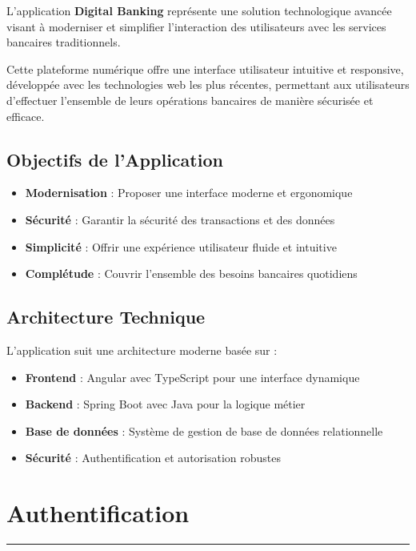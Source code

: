 \documentclass[11pt, a4paper]{article}
\newcommand{\accentline}{\textcolor{accent}{\rule{\textwidth}{1pt}}}
\begin{document}
L'application \textbf{Digital Banking} représente une solution technologique avancée visant à moderniser et simplifier l'interaction des utilisateurs avec les services bancaires traditionnels.

Cette plateforme numérique offre une interface utilisateur intuitive et responsive, développée avec les technologies web les plus récentes, permettant aux utilisateurs d'effectuer l'ensemble de leurs opérations bancaires de manière sécurisée et efficace.

\subsection{Objectifs de l'Application}

\begin{itemize}[leftmargin=20pt, itemsep=5pt]
    \item \textbf{Modernisation} : Proposer une interface moderne et ergonomique
    \item \textbf{Sécurité} : Garantir la sécurité des transactions et des données
    \item \textbf{Simplicité} : Offrir une expérience utilisateur fluide et intuitive
    \item \textbf{Complétude} : Couvrir l'ensemble des besoins bancaires quotidiens
\end{itemize}

\subsection{Architecture Technique}

L'application suit une architecture moderne basée sur :
\begin{itemize}[leftmargin=20pt, itemsep=5pt]
    \item \textbf{Frontend} : Angular avec TypeScript pour une interface dynamique
    \item \textbf{Backend} : Spring Boot avec Java pour la logique métier
    \item \textbf{Base de données} : Système de gestion de base de données relationnelle
    \item \textbf{Sécurité} : Authentification et autorisation robustes
\end{itemize}

\section{Authentification}
\accentline
\end{document}
